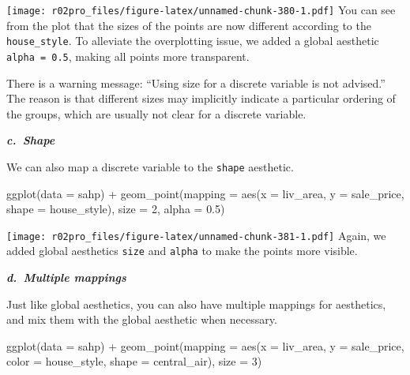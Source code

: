 \documentclass[
]{book}
\newenvironment{Shaded}{\begin{snugshade}}{\end{snugshade}}
\newcommand{\AttributeTok}[1]{\textcolor[rgb]{0.77,0.63,0.00}{#1}}
\newcommand{\DecValTok}[1]{\textcolor[rgb]{0.00,0.00,0.81}{#1}}
\newcommand{\FloatTok}[1]{\textcolor[rgb]{0.00,0.00,0.81}{#1}}
\newcommand{\FunctionTok}[1]{\textcolor[rgb]{0.00,0.00,0.00}{#1}}
\newcommand{\NormalTok}[1]{#1}
\newcommand{\SpecialCharTok}[1]{\textcolor[rgb]{0.00,0.00,0.00}{#1}}
\begin{document}
\texttt{[image: r02pro\_files/figure-latex/unnamed-chunk-380-1.pdf]}
You can see from the plot that the sizes of the points are now different according to the \texttt{house\_style}. To alleviate the overplotting issue, we added a global aesthetic \texttt{alpha\ =\ 0.5}, making all points more transparent.

There is a warning message: ``Using size for a discrete variable is not advised.'' The reason is that different sizes may implicitly indicate a particular ordering of the groups, which are usually not clear for a discrete variable.

\textbf{\emph{c.~Shape}}

We can also map a discrete variable to the \texttt{shape} aesthetic.

\begin{Shaded}
\begin{Highlighting}[]
\FunctionTok{ggplot}\NormalTok{(}\AttributeTok{data =}\NormalTok{ sahp) }\SpecialCharTok{+} \FunctionTok{geom\_point}\NormalTok{(}\AttributeTok{mapping =} \FunctionTok{aes}\NormalTok{(}\AttributeTok{x =}\NormalTok{ liv\_area, }\AttributeTok{y =}\NormalTok{ sale\_price, }\AttributeTok{shape =}\NormalTok{ house\_style), }\AttributeTok{size =} \DecValTok{2}\NormalTok{, }\AttributeTok{alpha =} \FloatTok{0.5}\NormalTok{)}
\end{Highlighting}
\end{Shaded}

\texttt{[image: r02pro\_files/figure-latex/unnamed-chunk-381-1.pdf]}
Again, we added global aesthetics \texttt{size} and \texttt{alpha} to make the points more visible.

\textbf{\emph{d.~Multiple mappings}}

Just like global aesthetics, you can also have multiple mappings for aesthetics, and mix them with the global aesthetic when necessary.

\begin{Shaded}
\begin{Highlighting}[]
\FunctionTok{ggplot}\NormalTok{(}\AttributeTok{data =}\NormalTok{ sahp) }\SpecialCharTok{+} \FunctionTok{geom\_point}\NormalTok{(}\AttributeTok{mapping =} \FunctionTok{aes}\NormalTok{(}\AttributeTok{x =}\NormalTok{ liv\_area, }\AttributeTok{y =}\NormalTok{ sale\_price, }\AttributeTok{color =}\NormalTok{ house\_style, }\AttributeTok{shape =}\NormalTok{ central\_air), }\AttributeTok{size =} \DecValTok{3}\NormalTok{)}
\end{Highlighting}
\end{Shaded}
\end{document}
